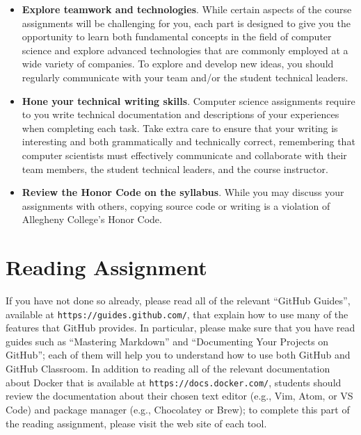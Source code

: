 \documentclass[11pt]{article}
\newcommand{\url}[1]{\lstinline{#1}}
\begin{document}
\begin{itemize}
\item {\bf Explore teamwork and technologies}. While certain aspects of the
  course assignments will be challenging for you, each part is designed to give
  you the opportunity to learn both fundamental concepts in the field of
  computer science and explore advanced technologies that are commonly employed
  at a wide variety of companies. To explore and develop new ideas, you should
  regularly communicate with your team and/or the student technical leaders.

\item {\bf Hone your technical writing skills}. Computer science assignments
  require to you write technical documentation and descriptions of your
  experiences when completing each task. Take extra care to ensure that your
  writing is interesting and both grammatically and technically correct,
  remembering that computer scientists must effectively communicate and
  collaborate with their team members, the student technical leaders, and the
  course instructor.

\item {\bf Review the Honor Code on the syllabus}. While you may discuss your
  assignments with others, copying source code or writing is a violation of
  Allegheny College's Honor Code.

\end{itemize}

\section*{Reading Assignment}

If you have not done so already, please read all of the relevant ``GitHub
Guides'', available at \url{https://guides.github.com/}, that explain how to use
many of the features that GitHub provides. In particular, please make sure that
you have read guides such as ``Mastering Markdown'' and ``Documenting Your
Projects on GitHub''; each of them will help you to understand how to use both
GitHub and GitHub Classroom. In addition to reading all of the relevant
documentation about Docker that is available at \url{https://docs.docker.com/},
students should review the documentation about their chosen text editor (e.g.,
Vim, Atom, or VS Code) and package manager (e.g., Chocolatey or Brew); to
complete this part of the reading assignment, please visit the web site of each
tool.
\end{document}
